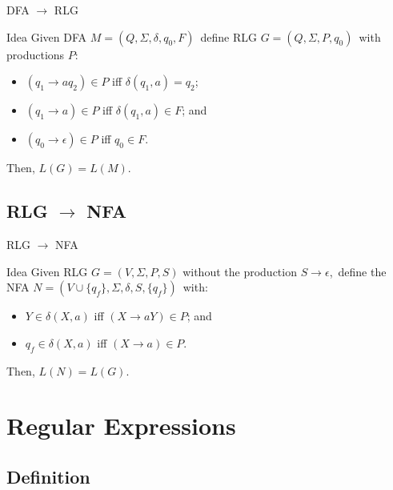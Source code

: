 \documentclass{beamer}
\def\padding{\vspace{0.5cm}}
\begin{document}
\begin{frame}{DFA $\to$ RLG}
    \begin{block}{Idea}
        Given DFA $M = (Q, \Sigma, \delta, q_0, F)$\pause\ define RLG $G = (Q, \Sigma, P, q_0)$\pause\ with productions $P$:\pause
        \begin{itemize}
            \item $(q_1 \to a q_2) \in P$ iff $\delta(q_1, a) = q_2$\pause;
            \item $(q_1 \to a) \in P$ iff $\delta(q_1, a) \in F$\pause; and
            \item $(q_0 \to \epsilon) \in P$ iff $q_0 \in F$.
        \end{itemize}\pause\padding
        Then, $L(G) = L(M)$.
    \end{block}
\end{frame}

\subsection{RLG $\to$ NFA}

\begin{frame}{RLG $\to$ NFA}
    \begin{block}{Idea}
        Given RLG $G = (V, \Sigma, P, S)$ without the production $S \to \epsilon$\pause,\ define the NFA $N = (V \cup \{q_f\}, \Sigma, \delta, S, \{q_f\})$\pause\ with:
        \begin{itemize}
            \item $Y \in \delta(X, a)$ iff $(X \to aY) \in P$\pause; and
            \item $q_f \in \delta(X, a)$ iff $(X \to a) \in P$.
        \end{itemize}\pause\padding
        Then, $L(N) = L(G)$.
    \end{block}
\end{frame}

\section{Regular Expressions}

\subsection{Definition}
\end{document}
